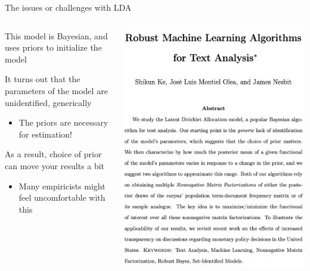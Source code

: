 \documentclass[notes,11pt, aspectratio=169]{beamer}
\newenvironment{wideitemize}{\itemize\addtolength{\itemsep}{10pt}}{\enditemize}
\begin{document}
  \begin{frame}{The issues or challenges with LDA}
    \begin{columns}[onlytextwidth, T] %
      \begin{column}{.5\textwidth}
    \begin{wideitemize}
    \item This model is Bayesian, and uses priors to initialize the model
    \item It turns out that the parameters of the model are
      unidentified, generically
      \begin{itemize}
      \item The priors are necessary for estimation!
      \end{itemize}
    \item As a result, choice of prior can move your results a bit
      \begin{itemize}
      \item Many empiricists might feel uncomfortable with this
      \end{itemize}
    \end{wideitemize}
        \end{wideitemize}
      \end{column}%
      \hfill%
      \begin{column}{.5\textwidth}
        \includegraphics[width=\linewidth]{images/pepe_1.png}
      \end{column}%
    \end{columns}
  \end{frame}
\end{document}

